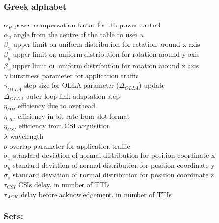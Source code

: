 \subsubsection*{Greek alphabet}

$\alpha_P$ \mytab power compensation factor for UL power control\\
$\alpha_u$ \mytab angle from the centre of the table to user $u$\\
$\beta_x$ \mytab upper limit on uniform distribution for rotation around x axis \\
$\beta_y$ \mytab upper limit on uniform distribution for rotation around y axis \\
$\beta_z$ \mytab upper limit on uniform distribution for rotation around z axis \\
$\gamma$ \mytab burstiness parameter for application traffic\\
$\gamma_{OLLA}$ \mytab step size for OLLA parameter ($\Delta_{OLLA}$) update\\
$\Delta_{OLLA}$ \mytab outer loop link adaptation step\\
$\eta_{OH}$ \mytab efficiency due to overhead\\
$\eta_{slot}$ \mytab efficiency in bit rate from slot format\\
$\eta_{CSI}$ \mytab efficiency from CSI acquisition\\
$\lambda$ \mytab wavelength\\
$o$ \mytab overlap parameter for application traffic\\
$\sigma_x$ \mytab standard deviation of normal distribution for position coordinate x \\
$\sigma_y$ \mytab standard deviation of normal distribution for position coordinate y \\
$\sigma_z$ \mytab standard deviation of normal distribution for position coordinate z \\
$\tau_{CSI}$ \mytab \acsp{CSI} delay, in number of \acsp{TTI} \\
$\tau_{ACK}$ \mytab delay before acknowledgement, in number of \acsp{TTI} \\

\subsubsection*{Sets:}

